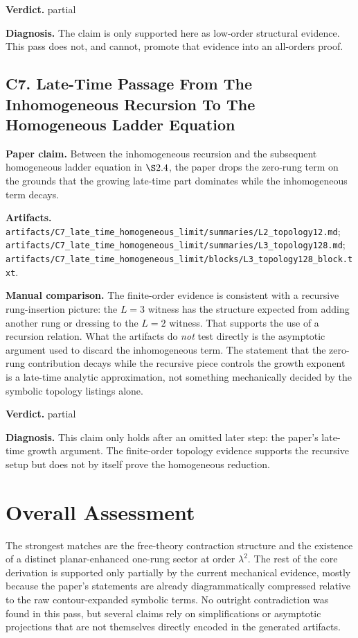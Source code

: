 \documentclass[11pt]{article}
\begin{document}
\textbf{Verdict.} partial

\textbf{Diagnosis.} The claim is only supported here as low-order structural evidence. This pass does not, and cannot, promote that evidence into an all-orders proof.

\subsection*{C7. Late-Time Passage From The Inhomogeneous Recursion To The Homogeneous Ladder Equation}
\textbf{Paper claim.} Between the inhomogeneous recursion and the subsequent homogeneous ladder equation in $\S 2.4$, the paper drops the zero-rung term on the grounds that the growing late-time part dominates while the inhomogeneous term decays.

\textbf{Artifacts.} \texttt{artifacts/C7\_late\_time\_homogeneous\_limit/summaries/L2\_topology12.md}; \texttt{artifacts/C7\_late\_time\_homogeneous\_limit/summaries/L3\_topology128.md}; \texttt{artifacts/C7\_late\_time\_homogeneous\_limit/blocks/L3\_topology128\_block.txt}.

\textbf{Manual comparison.} The finite-order evidence is consistent with a recursive rung-insertion picture: the $L=3$ witness has the structure expected from adding another rung or dressing to the $L=2$ witness. That supports the use of a recursion relation. What the artifacts do \emph{not} test directly is the asymptotic argument used to discard the inhomogeneous term. The statement that the zero-rung contribution decays while the recursive piece controls the growth exponent is a late-time analytic approximation, not something mechanically decided by the symbolic topology listings alone.

\textbf{Verdict.} partial

\textbf{Diagnosis.} This claim only holds after an omitted later step: the paper's late-time growth argument. The finite-order topology evidence supports the recursive setup but does not by itself prove the homogeneous reduction.

\section*{Overall Assessment}
The strongest matches are the free-theory contraction structure and the existence of a distinct planar-enhanced one-rung sector at order $\lambda^2$. The rest of the core derivation is supported only partially by the current mechanical evidence, mostly because the paper's statements are already diagrammatically compressed relative to the raw contour-expanded symbolic terms. No outright contradiction was found in this pass, but several claims rely on simplifications or asymptotic projections that are not themselves directly encoded in the generated artifacts.
\end{document}

